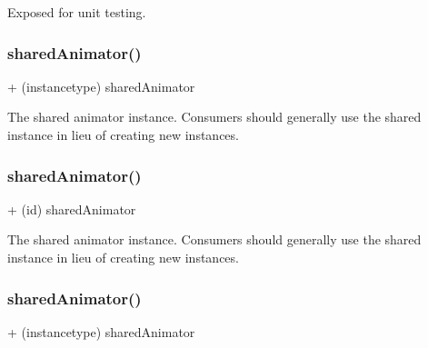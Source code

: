 Exposed for unit testing. \mbox{\label{interface_p_o_p_animator_aa6768f7ad741d8a92b72795700529783}} 
\subsubsection{\texorpdfstring{shared\+Animator()}{sharedAnimator()}\hspace{0.1cm}{\footnotesize\ttfamily [1/3]}}
{\footnotesize\ttfamily + (instancetype) shared\+Animator \begin{DoxyParamCaption}{ }\end{DoxyParamCaption}}

The shared animator instance.  Consumers should generally use the shared instance in lieu of creating new instances. \mbox{\label{interface_p_o_p_animator_ad9ba487d9bd5cdedfe429ddb76ffb6aa}} 
\subsubsection{\texorpdfstring{shared\+Animator()}{sharedAnimator()}\hspace{0.1cm}{\footnotesize\ttfamily [2/3]}}
{\footnotesize\ttfamily + (id) shared\+Animator \begin{DoxyParamCaption}{ }\end{DoxyParamCaption}}

The shared animator instance.  Consumers should generally use the shared instance in lieu of creating new instances. \mbox{\label{interface_p_o_p_animator_aa6768f7ad741d8a92b72795700529783}} 
\subsubsection{\texorpdfstring{shared\+Animator()}{sharedAnimator()}\hspace{0.1cm}{\footnotesize\ttfamily [3/3]}}
{\footnotesize\ttfamily + (instancetype) shared\+Animator \begin{DoxyParamCaption}{ }\end{DoxyParamCaption}}

